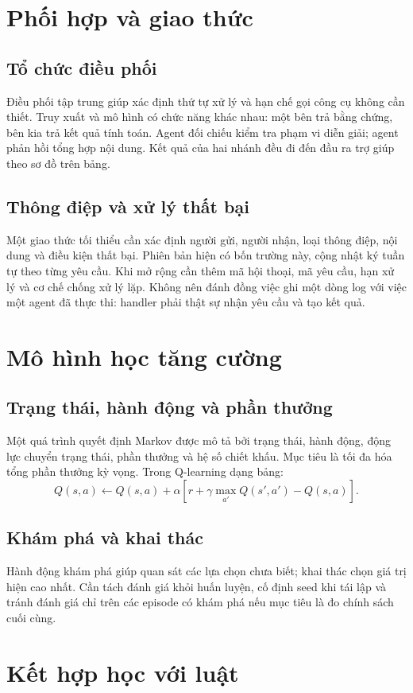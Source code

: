 \section{Phối hợp và giao thức}
\subsection{Tổ chức điều phối}
Điều phối tập trung giúp xác định thứ tự xử lý và hạn chế gọi công cụ không cần thiết. Truy xuất và mô hình có chức năng khác nhau: một bên trả bằng chứng, bên kia trả kết quả tính toán. Agent đối chiếu kiểm tra phạm vi diễn giải; agent phản hồi tổng hợp nội dung. Kết quả của hai nhánh đều đi đến đầu ra trợ giúp theo sơ đồ trên bảng.

\subsection{Thông điệp và xử lý thất bại}
Một giao thức tối thiểu cần xác định người gửi, người nhận, loại thông điệp, nội dung và điều kiện thất bại. Phiên bản hiện có bốn trường này, cộng nhật ký tuần tự theo từng yêu cầu. Khi mở rộng cần thêm mã hội thoại, mã yêu cầu, hạn xử lý và cơ chế chống xử lý lặp. Không nên đánh đồng việc ghi một dòng log với việc một agent đã thực thi: handler phải thật sự nhận yêu cầu và tạo kết quả.
\section{Mô hình học tăng cường}
\subsection{Trạng thái, hành động và phần thưởng}
Một quá trình quyết định Markov được mô tả bởi trạng thái, hành động, động lực chuyển trạng thái, phần thưởng và hệ số chiết khấu. Mục tiêu là tối đa hóa tổng phần thưởng kỳ vọng. Trong Q-learning dạng bảng:
\[
Q(s,a)\leftarrow Q(s,a)+\alpha\left[r+\gamma\max_{a'}Q(s',a')-Q(s,a)\right].
\]
\subsection{Khám phá và khai thác}
Hành động khám phá giúp quan sát các lựa chọn chưa biết; khai thác chọn giá trị hiện cao nhất. Cần tách đánh giá khỏi huấn luyện, cố định seed khi tái lập và tránh đánh giá chỉ trên các episode có khám phá nếu mục tiêu là đo chính sách cuối cùng.
\section{Kết hợp học với luật}
